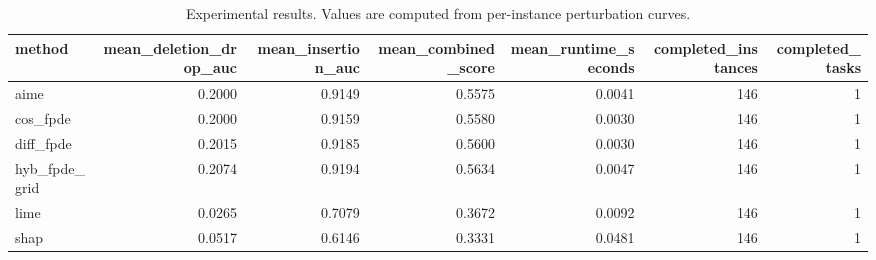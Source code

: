 \begin{table}[t]
\caption{Experimental results. Values are computed from per-instance perturbation curves.}
\label{tab:main_results_computed}
\centering
\begin{tabular}{lrrrrrr}
\toprule
method & mean\_deletion\_drop\_auc & mean\_insertion\_auc & mean\_combined\_score & mean\_runtime\_seconds & completed\_instances & completed\_tasks \\
\midrule
aime & 0.2000 & 0.9149 & 0.5575 & 0.0041 & 146 & 1 \\
cos\_fpde & 0.2000 & 0.9159 & 0.5580 & 0.0030 & 146 & 1 \\
diff\_fpde & 0.2015 & 0.9185 & 0.5600 & 0.0030 & 146 & 1 \\
hyb\_fpde\_grid & 0.2074 & 0.9194 & 0.5634 & 0.0047 & 146 & 1 \\
lime & 0.0265 & 0.7079 & 0.3672 & 0.0092 & 146 & 1 \\
shap & 0.0517 & 0.6146 & 0.3331 & 0.0481 & 146 & 1 \\
\bottomrule
\end{tabular}

\end{table}
